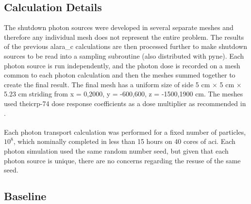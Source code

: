 \documentclass[12pt]{article}
\begin{document}
\subsection{Calculation Details}
The shutdown photon sources were developed in several separate meshes and
therefore any individual mesh does not represent the entire problem. The
results of the previous \gls{alara_c} calculations are then processed further
to make shutdown sources to be read into a sampling subroutine (also distributed
with \gls{pyne}). Each photon source is run independently, and the photon dose
is recorded on a mesh common to each photon calculation and then the meshes
summed together to create the final result. The final mesh has a uniform size of
side 5 cm $\times$ 5 cm $\times$ 5.23 cm striding from x = {0,2000}, y = {-600,600},
 z = {-1500,1900} cm. The meshes used the\gls{icrp}-74 dose response coefficients 
as a dose multiplier as recommended in \cite{iter_sdr_coeffs}.
\\
\\
Each photon transport calculation was performed for a fixed number of particles,
$10^8$, which nominally completed in less than 15 hours on 40 cores of
\gls{aci}. Each photon simulation used the same random number seed, but given
that each photon source is unique, there are no concerns regarding the resuse
of the same seed.


\subsection{Baseline}
\end{document}
